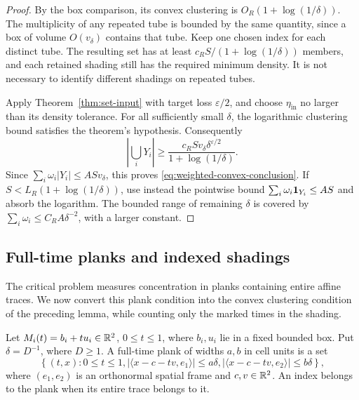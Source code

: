 \begin{proof}
By the box comparison, its convex clustering is
$O_R(1+\log(1/\delta))$. The multiplicity of any repeated tube is
bounded by the same quantity, since a box of volume $O(v_\delta)$
contains that tube. Keep one chosen index for each distinct tube.
The resulting set has at least
$c_RS/(1+\log(1/\delta))$ members, and each retained shading still
has the required minimum density. It is not necessary to identify
different shadings on repeated tubes.

Apply Theorem~\ref{thm:set-input} with target loss
$\varepsilon/2$, and choose $\eta_{\mathrm{in}}$ no larger than its density
tolerance. For all sufficiently small $\delta$, the logarithmic
clustering bound satisfies the theorem's hypothesis. Consequently
\[
 \left|\bigcup_iY_i\right|
 \ge \frac{c_RS v_\delta\delta^{\varepsilon/2}}
             {1+\log(1/\delta)}.
\]
Since $\sum_i\omega_i|Y_i|\le ASv_\delta$, this proves
\eqref{eq:weighted-convex-conclusion}. If
$S<L_R(1+\log(1/\delta))$, use instead the pointwise bound
$\sum_i\omega_i\mathbf 1_{Y_i}\le AS$ and absorb the logarithm.
The bounded range of remaining $\delta$ is covered by
$\sum_i\omega_i\le C_RA\delta^{-2}$, with a larger constant.
\end{proof}

\subsection{Full-time planks and indexed shadings}

The critical problem measures concentration in planks containing entire
affine traces. We now convert this plank condition into the convex
clustering condition of the preceding lemma, while counting only the
marked times in the shading.

Let $M_i(t)=b_i+tu_i\in\mathbb R^2$, $0\le t\le1$, where $b_i,u_i$
lie in a fixed bounded box. Put $\delta=D^{-1}$, where $D\ge1$.
A full-time plank
of widths $a,b$ in cell units is a set
\begin{equation}\label{eq:input-plank}
 \left\{(t,x):0\le t\le1,
   |\langle x-c-tv,e_1\rangle|\le a\delta,
   |\langle x-c-tv,e_2\rangle|\le b\delta\right\},
\end{equation}
where $(e_1,e_2)$ is an orthonormal spatial frame and $c,v\in\mathbb R^2$.
An index belongs to the plank when its entire trace belongs to it.

